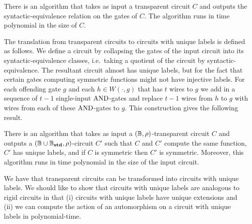 \documentclass[a4paper,UKenglish]{lipics-v2018}
\begin{document}
\begin{lemma}
  There is an algorithm that takes as input a transparent circuit $C$ and
  outputs the syntactic-equivalence relation on the gates of $C$. The algorithm
  runs in time polynomial in the size of $C$.
  \label{lem:transparent-syntactic-equiv}
\end{lemma}

The translation from transparent circuits to circuits with unique labels is
defined as follows. We define a circuit by collapsing the gates of the input
circuit into its syntactic-equivalence classes, i.e.\ taking a quotient of the
circuit by syntactic-equivalence. The resultant circuit almost has unique
labels, but for the fact that certain gates computing symmetric functions might
not have injective labels. For each offending gate $g$ and each $h \in W(\cdot,
g)$ that has $t$ wires to $g$ we add in a sequence of $t-1$ single-input
$\text{\upshape AND}$-gates and replace $t-1$ wires from $h$ to $g$ with wires from each of
these $\text{\upshape AND}$-gates to $g$. This construction gives the following result.

\begin{lemma}
  There is an algorithm that takes as input a $(\mathbb{B}, \rho)$-transparent circuit
  $C$ and outputs a $(\mathbb{B} \cup \mathbb{B}_{\text{\textbf{std}}},
  \rho)$-circuit $C'$ such that $C$ and $C'$ compute the same function, $C'$ has
  unique labels, and if $C$ is symmetric then $C'$ is symmetric. Moreover, this
  algorithm runs in time polynomial in the size of the input circuit.
  \label{lem:transparent-unique}
\end{lemma}


We have that transparent circuits can be transformed into circuits with unique
labels. We should like to show that circuits with unique labels are analogous to
rigid circuits in that (i) circuits with unique labels have unique extensions
and (ii) we can compute the action of an automorphism on a circuit with unique
labels in polynomial-time.
\end{document}
